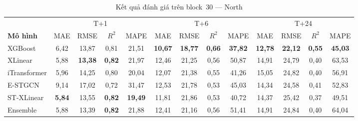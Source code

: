 
\begin{table}[H]
\centering
\caption{Kết quả đánh giá trên block~30 --- North}
\label{tab:block30_north}
\small
\begin{tabular}{l|cccc|cccc|cccc}
\toprule
 & \multicolumn{4}{c|}{T+1} & \multicolumn{4}{c|}{T+6} & \multicolumn{4}{c}{T+24} \\
\textbf{Mô hình} & MAE & RMSE & $R^2$ & MAPE & MAE & RMSE & $R^2$ & MAPE & MAE & RMSE & $R^2$ & MAPE \\
\midrule
XGBoost     & 6,42 & 13,87 & 0,81 & 21,51 & \textbf{10,67} & \textbf{18,77} & \textbf{0,66} & \textbf{37,82} & \textbf{12,78} & \textbf{22,12} & \textbf{0,55} & \textbf{45,03} \\
XLinear     & 5,88 & \textbf{13,38} & \textbf{0,82} & 21,97 & 12,46 & 21,25 & 0,56 & 50,87 & 14,91 & 24,79 & 0,40 & 63,53 \\
iTransformer & 5,96 & 14,25 & 0,80 & 20,04 & 12,07 & 21,38 & 0,55 & 41,26 & 15,05 & 24,82 & 0,40 & 56,91 \\
E-STGCN     & 9,14 & 17,02 & 0,72 & 31,47 & 12,53 & 21,78 & 0,53 & 45,03 & 14,34 & 24,58 & 0,41 & 52,83 \\
ST-XLinear  & \textbf{5,84} & 13,55 & \textbf{0,82} & \textbf{19,49} & 11,81 & 21,86 & 0,53 & 40,72 & 14,37 & 25,42 & 0,37 & 49,51 \\
Ensemble    & 5,88 & 13,39 & \textbf{0,82} & 21,88 & 12,41 & 21,16 & 0,56 & 51,41 & 14,91 & 24,84 & 0,40 & 64,04 \\
\bottomrule
\end{tabular}
\end{table}

